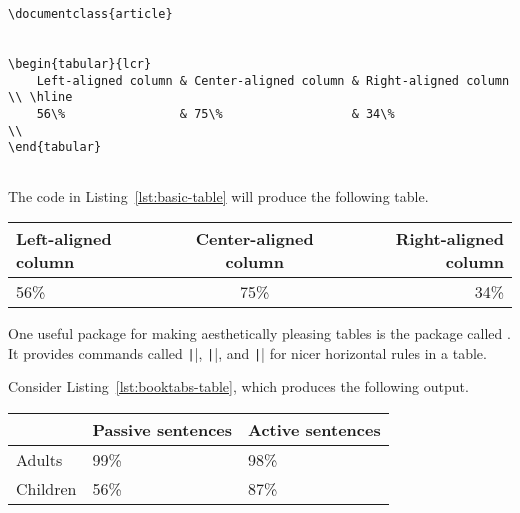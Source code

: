 \begin{listing}[htbp]
	\centering
	\begin{verbatim}
\documentclass{article}


\begin{tabular}{lcr}
    Left-aligned column & Center-aligned column & Right-aligned column \\ \hline
    56\%                & 75\%                  & 34\%                 \\
\end{tabular}


	\end{verbatim}
	\caption{A basic table in \LaTeX}
	\label{lst:basic-table}
\end{listing}

\begin{minipage}{\textwidth}

The code in Listing~\ref{lst:basic-table} will produce the following table.

\begin{center}
	\begin{tabular}{lcr}
		Left-aligned column & Center-aligned column & Right-aligned column \\ \hline
		56\%                & 75\%                  & 34\%                 \\
	\end{tabular}
\end{center}

\end{minipage}

One useful package for making aesthetically pleasing tables is the package called .
It provides commands called \texttt|\toprule|, \texttt|\bottomrule|, and \texttt|\midrule| for nicer horizontal rules in a table.

\begin{minipage}{\textwidth}

Consider Listing~\ref{lst:booktabs-table}, which produces the following output.

\begin{center}
	\begin{tabular}{lll}
		\toprule
		         & Passive sentences & Active sentences \\ \midrule
		Adults   & 99\%              & 98\%             \\
		Children & 56\%              & 87\%             \\
		\bottomrule
	\end{tabular}
\end{center}

\end{minipage}

